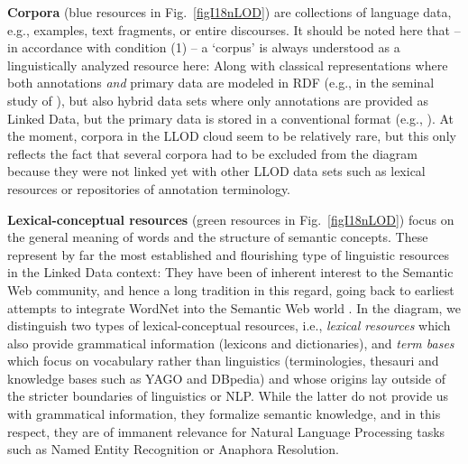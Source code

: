 \textbf{Corpora} (blue resources in Fig.\ \ref{figI18nLOD}) are collections of language data, e.g., examples, text fragments, or entire discourses.
It should be noted here that -- in accordance with condition (1) -- a `corpus' is always understood as a linguistically analyzed resource here:
Along with classical representations where both annotations \emph{and} primary data are modeled in RDF (e.g., in the seminal study of \citep{burchardt2008formalising}), 
but also hybrid data sets where only annotations are provided as Linked Data, but the primary data is stored in a conventional format (e.g., \citep{cassidy2010rdf}).
At the moment, corpora in the LLOD cloud seem to be relatively rare, 
but this only reflects the fact that several corpora had to be excluded from the diagram because they were not linked yet with other LLOD data sets such as lexical resources or repositories of annotation terminology.

\textbf{Lexical-conceptual resources} (green resources in Fig.\ \ref{figI18nLOD}) focus on the general meaning of words and the structure of semantic concepts. 
These represent by far the most established and flourishing type of linguistic resources in the Linked Data context: They have been of inherent interest to the Semantic Web community, and hence a long tradition in this regard, going back to earliest attempts to integrate WordNet into the Semantic Web world \citep{gangemi2003ontowordnet}. 
In the diagram, we distinguish two types of lexical-conceptual resources, i.e., 
\emph{lexical resources} which also provide grammatical information (lexicons and dictionaries), and 
\emph{term bases} which focus on vocabulary rather than linguistics (terminologies, thesauri and knowledge bases such as YAGO and DBpedia) 
and whose origins lay outside of the stricter boundaries of linguistics or NLP. 
While the latter do not provide us with grammatical information, they formalize semantic knowledge, and in this respect, they are of immanent relevance for Natural Language Processing tasks such as Named Entity Recognition or Anaphora Resolution. 

